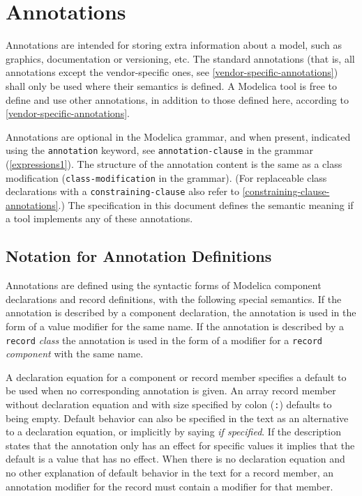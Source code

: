 \chapter{Annotations}\label{annotations}

Annotations are intended for storing extra information about a model, such as graphics, documentation or versioning, etc.
The standard annotations (that is, all annotations except the vendor-specific ones, see \cref{vendor-specific-annotations}) shall only be used where their semantics is defined.
A Modelica tool is free to define and use other annotations, in addition to those defined here, according to \cref{vendor-specific-annotations}.

Annotations are optional in the Modelica grammar, and when present, indicated using the \lstinline!annotation! keyword, see \lstinline[language=grammar]!annotation-clause! in the grammar (\cref{expressions1}).
The structure of the annotation content is the same as a class modification (\lstinline[language=grammar]!class-modification! in the grammar).
(For replaceable class declarations with a \lstinline[language=grammar]!constraining-clause! also refer to \cref{constraining-clause-annotations}.)
The specification in this document defines the semantic meaning if a tool implements any of these annotations.


\section{Notation for Annotation Definitions}\label{notation-for-annotation-definitions}

Annotations are defined using the syntactic forms of Modelica component declarations and record definitions, with the following special semantics.
If the annotation is described by a component declaration, the annotation is used in the form of a value modifier for the same name.
If the annotation is described by a \lstinline!record! \emph{class} the annotation is used in the form of a modifier for a \lstinline!record! \emph{component} with the same name.

A declaration equation for a component or record member specifies a default to be used when no corresponding annotation is given.
An array record member without declaration equation and with size specified by colon (\lstinline!:!) defaults to being empty.
Default behavior can also be specified in the text as an alternative to a declaration equation, or implicitly by saying \emph{if specified}.
If the description states that the annotation only has an effect for specific values it implies that the default is a value that has no effect.
When there is no declaration equation and no other explanation of default behavior in the text for a record member, an annotation modifier for the record must contain a modifier for that member.

